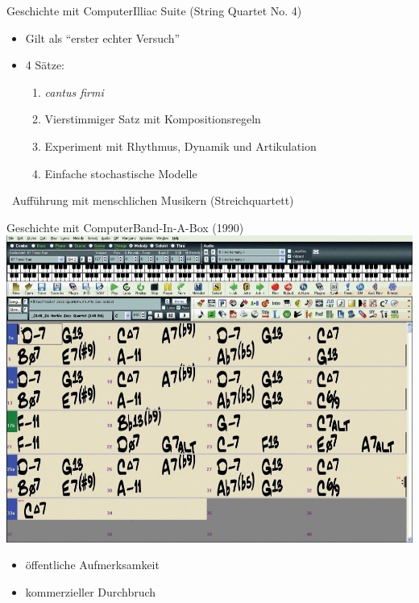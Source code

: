 \begin{frame}{Geschichte mit Computer}{Illiac Suite (String Quartet No. 4)}
	
	
	\begin{itemize}
		\item Gilt als \enquote{erster echter Versuch}
		\item 4 Sätze:
		\begin{enumerate}
			\item \emph{cantus firmi}
			\item Vierstimmiger Satz mit Kompositionsregeln
			\item Experiment mit Rhythmus, Dynamik und Artikulation 
			\item Einfache stochastische Modelle
		\end{enumerate}
	\end{itemize}
	
	\bigskip
	\attentionSign~Aufführung mit menschlichen Musikern (Streichquartett)

	
\end{frame}

\begin{frame}{Geschichte mit Computer}{Band-In-A-Box (1990)}
	\centering
	\includegraphics[width=.6\textwidth]{img/bandinabox.jpg}
	\parbox{0.3\textwidth}{
		\begin{itemize}
			\vspace{-2cm}
			\item öffentliche Aufmerksamkeit
			\item kommerzieller Durchbruch
		\end{itemize}
	}
\end{frame}


